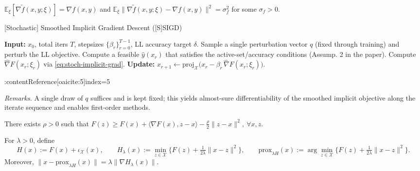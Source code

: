 \begin{assumption}
$\mathbb{E}_\xi[\nabla \tilde f(x,y;\xi)] = \nabla f(x,y)$ and 
$\mathbb{E}_\xi\|\nabla \tilde f(x,y;\xi)-\nabla f(x,y)\|^2=\sigma_f^2$ for some $\sigma_f>0$. 
\label{ass:stoch}
\end{assumption}


\begin{algorithm}[H]
\caption{[Stochastic] Smoothed Implicit Gradient Descent \;([S]SIGD)}
\begin{algorithmic}[1]
\State \textbf{Input:} $x_0$, total iters $T$, stepsizes $\{\beta_r\}_{r=0}^{T-1}$, LL accuracy target $\delta$.
\State Sample a single perturbation vector $q$ (fixed through training) and perturb the LL objective.
    \State Compute a feasible $\hat y(x_r)$ that satisfies the active-set/accuracy conditions (Assump. 2 in the paper).
    \State Compute $\widehat{\nabla}F(x_r;\xi_r)$ via \eqref{eq:stoch-implicit-grad}.
    \State \textbf{Update:} $x_{r+1} \leftarrow \mathrm{proj}_{\mathcal{X}}\!\big(x_r - \beta_r\,\widehat{\nabla}F(x_r;\xi_r)\big)$.
\EndFor
\end{algorithmic}
\end{algorithm}
:contentReference[oaicite:5]{index=5}

\emph{Remarks.} A single draw of $q$ suffices and is kept fixed; this yields almost-sure differentiability of the smoothed implicit objective along the iterate sequence and enables first-order methods.

\begin{assumption}
There exists $\rho>0$ such that $F(z)\ge F(x)+\langle \nabla F(x), z-x\rangle - \frac{\rho}{2}\|z-x\|^2,\ \forall x,z.$
\label{ass:weakly}
\end{assumption}


\begin{definition}
For $\lambda>0$, define 
\[
H(x):=F(x)+\iota_{\mathcal{X}}(x),\qquad 
H_\lambda(x):=\min_{z\in\mathcal{X}}\Big\{F(z)+\tfrac{1}{2\lambda}\|x-z\|^2\Big\},\qquad 
\mathrm{prox}_{\lambda H}(x):=\arg\min_{z\in\mathcal{X}}\Big\{F(z)+\tfrac{1}{2\lambda}\|x-z\|^2\Big\}.
\]
Moreover, $\|x-\mathrm{prox}_{\lambda H}(x)\|=\lambda\|\nabla H_\lambda(x)\|$.
\label{def:moreau}
\end{definition}


